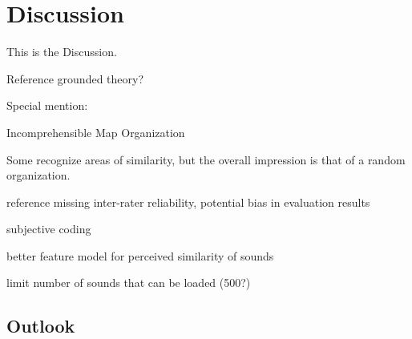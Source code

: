 
\section{Discussion}
\label{sec:discussion}
This is the Discussion.

Reference grounded theory?

Special mention:

Incomprehensible Map Organization

Some recognize areas of similarity, but the overall impression is that of a
random organization.


reference missing inter-rater reliability,
potential bias in evaluation results

subjective coding

better feature model for perceived similarity of sounds

limit number of sounds that can be loaded (500?)



\subsection{Outlook}
\label{subsec:outlook}
